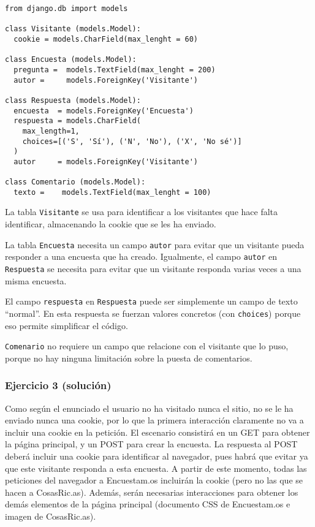 \begin{verbatim}
from django.db import models

class Visitante (models.Model):
  cookie = models.CharField(max_lenght = 60)

class Encuesta (models.Model):
  pregunta =  models.TextField(max_lenght = 200)
  autor =     models.ForeignKey('Visitante')

class Respuesta (models.Model):
  encuesta  = models.ForeignKey('Encuesta')
  respuesta = models.CharField(
    max_length=1,
    choices=[('S', 'Sí'), ('N', 'No'), ('X', 'No sé')]
  )
  autor     = models.ForeignKey('Visitante')

class Comentario (models.Model):
  texto =    models.TextField(max_lenght = 100)
\end{verbatim}

La tabla \texttt{Visitante} se usa para identificar a los visitantes que hace falta identificar, almacenando la cookie que se les ha enviado.

La tabla \texttt{Encuesta} necesita un campo \texttt{autor} para evitar que un visitante pueda responder a una encuesta que ha creado. Igualmente, el campo \texttt{autor} en \texttt{Respuesta} se necesita para evitar que un visitante responda varias veces a una misma encuesta.

El campo \texttt{respuesta} en \texttt{Respuesta} puede ser simplemente un campo de texto ``normal''. En esta respuesta se fuerzan valores concretos (con \texttt{choices}) porque eso permite simplificar el código.

\texttt{Comenario} no requiere un campo que relacione con el visitante que lo puso, porque no hay ninguna limitación sobre la puesta de comentarios.


\subsubsection{Ejercicio 3 (solución)}

Como según el enunciado el usuario no ha visitado nunca el sitio, no se le ha enviado nunca una cookie, por lo que la primera interacción claramente no va a incluir una cookie en la petición. El escenario consistirá en un GET para obtener la página principal, y un POST para crear la encuesta. La respuesta al POST deberá incluir una cookie para identificar al navegador, pues habrá que evitar ya que este visitante responda a esta encuesta. A partir de este momento, todas las peticiones del navegador a Encuestam.os incluirán la cookie (pero no las que se hacen a CosasRic.as). Además, serán necesarias interacciones para obtener los demás elementos de la página principal (documento CSS de Encuestam.os e imagen de CosasRic.as).

